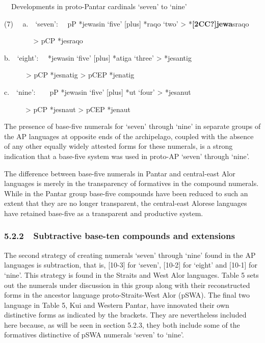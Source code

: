 \ \ Developments in proto-Pantar cardinals {\textquoteleft}seven{\textquoteright} to {\textquoteleft}nine{\textquoteright} 

(7) \ \ a.\ \ {\textquoteleft}seven{\textquoteright}: \ \ pP *jewasin {\textquoteleft}five{\textquoteright} [plus] *raqo {\textquoteleft}two{\textquoteright} {\textgreater} *\textbf{[2CC?]j}\textbf{ewa}s{\textprimstress}raqo\textit{ }

\textit{\ \ \ \ \ \ \ \ }{\textgreater}  pCP *jesraqo\textit{ }

b.\ \ {\textquoteleft}eight{\textquoteright}: \ \ *jewasin {\textquoteleft}five{\textquoteright} [plus] *atiga {\textquoteleft}three{\textquoteright} {\textgreater} *je{\textprimstress}santig\textit{ }

\textit{\ \ \ \ \ \ }{\textgreater} pCP *jesnatig {\textgreater} pCEP *jenatig 

c.\ \ {\textquoteleft}nine{\textquoteright}:\ \ \ \ pP *jewasin {\textquoteleft}five{\textquoteright} [plus] *ut {\textquoteleft}four{\textquoteright} {\textgreater} *je{\textprimstress}sanut 

\ \ \ \ \ \ {\textgreater} pCP *jesnaut {\textgreater} pCEP *jenaut 

The presence of base-five numerals for {\textquoteleft}seven{\textquoteright} through {\textquoteleft}nine{\textquoteright} in separate groups of the AP languages at opposite ends of the archipelago, coupled with the absence of any other equally widely attested forms for these numerals, is a strong indication that a base-five system was used in proto-AP {\textquoteleft}seven{\textquoteright} through {\textquoteleft}nine{\textquoteright}. 

The difference between base-five numerals in Pantar and central-east Alor languages is merely in the transparency of formatives in the compound numerals. While in the Pantar group base-five compounds have been reduced to such an extent that they are no longer transparent, the central-east Alorese languages have retained base-five as a transparent and productive system. 

\subsubsection[5.2.2\ \ Subtractive base{}-ten compounds and extensions]{5.2.2\ \ Subtractive base-ten compounds and extensions}
The second strategy of creating numerals {\textquoteleft}seven{\textquoteright} through {\textquoteleft}nine{\textquoteright} found in the AP languages is subtraction, that is, [10-3] for {\textquoteleft}seven{\textquoteright}, [10-2] for {\textquoteleft}eight{\textquoteright} and  [10-1] for {\textquoteleft}nine{\textquoteright}. This strategy is found in the Straits and West Alor languages. Table 5 sets out the numerals under discussion in this group along with their reconstructed forms in the ancestor language proto-Straits-West Alor (pSWA). The final two language in Table 5, Kui and Western Pantar, have innovated their own distinctive forms as indicated by the brackets. They are nevertheless included here because, as will be seen in section 5.2.3, they both include some of the formatives distinctive of pSWA numerals {\textquoteleft}seven{\textquoteright} to {\textquoteleft}nine{\textquoteright}.

